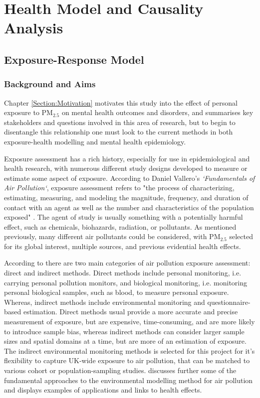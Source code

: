 \chapter{Health Model and Causality Analysis}
\section{Exposure-Response Model}
\subsection{Background and Aims}
Chapter \ref{Section:Motivation} motivates this study into the effect of personal exposure to PM$_{2.5}$ on mental health outcomes and disorders, and summarises key stakeholders and questions involved in this area of research, but to begin to disentangle this relationship one must look to the current methods in both exposure-health modelling and mental health epidemiology.

Exposure assessment has a rich history, especially for use in epidemiological and health research, with numerous different study designs developed to measure or estimate some aspect of exposure. According to Daniel Vallero's \emph{`Fundamentals of Air Pollution`}, exposure assessment refers to "the process of characterizing, estimating, measuring, and modeling the magnitude, frequency, and duration of contact with an agent as well as the number and characteristics of the population exposed" \citep{Vallero2014AirExposures}. The agent of study is usually something with a potentially harmful effect, such as chemicals, biohazards, radiation, or pollutants. As mentioned previously, many different air pollutants could be considered, with PM$_{2.5}$ selected for its global interest, multiple sources, and previous evidential health effects. 

According to \cite{Han2017HumanPollution} there are two main categories of air pollution exposure assessment: direct and indirect methods. Direct methods include personal monitoring, i.e. carrying personal pollution monitors, and biological monitoring, i.e. monitoring personal biological samples, such as blood, to measure personal exposure. Whereas, indirect methods include environmental monitoring and questionnaire-based estimation. Direct methods usual provide a more accurate and precise measurement of exposure, but are expensive, time-consuming, and are more likely to introduce sample bias, whereas indirect methods can consider larger sample sizes and spatial domains at a time, but are more of an estimation of exposure. The indirect environmental monitoring methods is selected for this project for it's flexibility to capture UK-wide exposure to air pollution, that can be matched to various cohort or population-sampling studies. \cite{Jerrett2004AModels} discusses further some of the fundamental approaches to the environmental modelling method for air pollution and displays examples of applications and links to health effects. 

